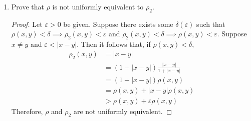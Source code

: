 \documentclass{article}
\begin{document}
\begin{enumerate}
\begin{enumerate}
\begin{proof}
\begin{align*}
                                                 & = (1+\lvert x-y\rvert)\frac{\lvert x-y\rvert}{1+\lvert x-y\rvert} \\
                                                 & = (1+\lvert x-y\rvert)\rho(x,y)                                   \\
                                                 & < (1+\lvert x-y\rvert)\delta                                      \\
                                                 & = (1+\lvert x-y\rvert)\frac{\varepsilon}{1+\lvert x-y\rvert}      \\
                                                 & = \varepsilon
                              \end{align*}
                        \end{proof}
                  \item Prove that $\rho$ is not uniformly equivalent to
                        $\rho_2$.
                        \begin{proof}
                              Let $\varepsilon>0$ be given. Suppose there exists
                              some $\delta(\varepsilon)$ such that
                              $\rho(x,y)<\delta\implies\rho_2(x,y)<\varepsilon$
                              and $\rho_2(x,y)<\delta\implies\rho(x,y)<\varepsilon$.
                              Suppose $x\neq y$ and $\varepsilon < \lvert x-y\rvert$.
                              Then it follows that, if $\rho(x,y)<\delta$,
                              \begin{align*}
                                    \rho_2(x,y) & = \lvert x-y\rvert                                                \\
                                                & = (1+\lvert x-y\rvert)\frac{\lvert x-y\rvert}{1+\lvert x-y\rvert} \\
                                                & = (1+\lvert x-y\rvert)\rho(x,y)                                   \\
                                                & = \rho(x,y) + \lvert x-y\rvert\rho(x,y)                           \\
                                                & > \rho(x,y) + \varepsilon\rho(x,y)
                              \end{align*}
                              Therefore, $\rho$ and $\rho_2$ are not uniformly equivalent.
                        \end{proof}
            \end{enumerate}
\end{enumerate}
\end{document}
